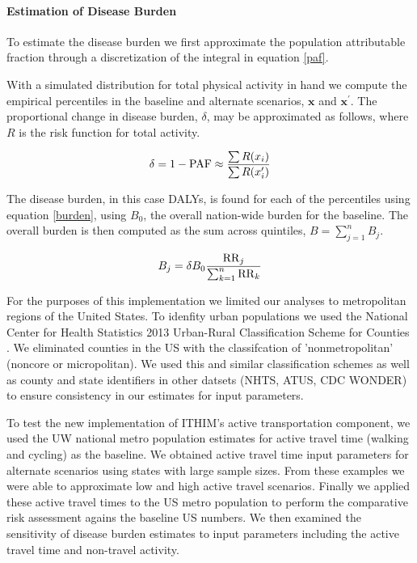 \paragraph{Estimation of Disease Burden}

To estimate the disease burden we first approximate the population
attributable fraction through a discretization of the integral in
equation \ref{paf}.  


With a simulated distribution for total physical activity in hand we
compute the empirical percentiles in the baseline and alternate
scenarios, $\mathbf{x}$ and $\mathbf{x}^\prime$. The proportional
change in disease burden, $\delta$, may be approximated as follows,
where $R$ is the risk function for total activity.

\begin{equation}
\delta = 1 - \mathrm{PAF} \approx \frac{\sum R(x_i)}{\sum R(x_i^\prime)}
\end{equation}

The disease burden, in this case DALYs, is found for each of the
percentiles using equation \ref{burden}, using $B_0$, the overall nation-wide burden for
the baseline.  The overall burden is then computed as the sum across
quintiles, $B=\sum_{j=1}^n B_j$.

\begin{equation}
B_j = \delta B_0\frac{\mathrm{RR}_j}{\sum_{k=1}^n \mathrm{RR}_k}\label{burden}
\end{equation}

For the purposes of this implementation we limited our analyses to
metropolitan regions of the United States. To idenfity urban
populations we used the National Center for Health Statistics 2013
Urban-Rural Classification Scheme for Counties \cite{ingram2014}. We
eliminated counties in the US with the classifcation of
'nonmetropolitan' (noncore or micropolitan). We used this and similar
classification schemes as well as county and state identifiers in
other datsets (NHTS, ATUS, CDC WONDER) to ensure consistency in our
estimates for input parameters.

To test the new implementation of ITHIM's active transportation
component, we used the UW national metro population estimates for
active travel time (walking and cycling) as the baseline. We obtained
active travel time input parameters for alternate scenarios using
states with large sample sizes. From these examples we were able to
approximate low and high active travel scenarios. Finally we applied
these active travel times to the US metro population to perform the
comparative risk assessment agains the baseline US numbers. We then
examined the sensitivity of disease burden estimates to input
parameters including the active travel time and non-travel activity.

